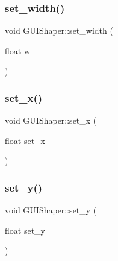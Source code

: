 \hypertarget{class_g_u_i_shaper_ae0c7341ab602652fbfad2d2b0abbf901}{}\label{class_g_u_i_shaper_ae0c7341ab602652fbfad2d2b0abbf901} 
\subsubsection{\texorpdfstring{set\+\_\+width()}{set\_width()}}
{\footnotesize\ttfamily void G\+U\+I\+Shaper\+::set\+\_\+width (\begin{DoxyParamCaption}\item[{float}]{w }\end{DoxyParamCaption})}

\hypertarget{class_g_u_i_shaper_a70e2b6d454095bbe73bc063f5fde22b1}{}\label{class_g_u_i_shaper_a70e2b6d454095bbe73bc063f5fde22b1} 
\subsubsection{\texorpdfstring{set\+\_\+x()}{set\_x()}}
{\footnotesize\ttfamily void G\+U\+I\+Shaper\+::set\+\_\+x (\begin{DoxyParamCaption}\item[{float}]{set\+\_\+x }\end{DoxyParamCaption})}

\hypertarget{class_g_u_i_shaper_a2f3b4dc9307c14c01826c1aabdbc5a43}{}\label{class_g_u_i_shaper_a2f3b4dc9307c14c01826c1aabdbc5a43} 
\subsubsection{\texorpdfstring{set\+\_\+y()}{set\_y()}}
{\footnotesize\ttfamily void G\+U\+I\+Shaper\+::set\+\_\+y (\begin{DoxyParamCaption}\item[{float}]{set\+\_\+y }\end{DoxyParamCaption})}

\hypertarget{class_g_u_i_shaper_a121479d9dc00d128c3b563c49df817af}{}\label{class_g_u_i_shaper_a121479d9dc00d128c3b563c49df817af} 

